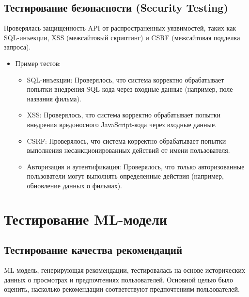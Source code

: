 \subsection*{Тестирование безопасности (Security Testing)}
Проверялась защищенность API от распространенных уязвимостей, таких как SQL-инъекции, XSS (межсайтовый скриптинг) и CSRF (межсайтовая подделка запроса).

\begin{itemize}
    \item Пример тестов:
    \begin{itemize}
        \item SQL-инъекции: Проверялось, что система корректно обрабатывает попытки внедрения SQL-кода через входные данные (например, поле названия фильма).
        \item XSS: Проверялось, что система корректно обрабатывает попытки внедрения вредоносного JavaScript-кода через входные данные.
        \item CSRF: Проверялось, что система корректно обрабатывает попытки выполнения несанкционированных действий от имени пользователя.
        \item Авторизация и аутентификация: Проверялось, что только авторизованные пользователи могут выполнять определенные действия (например, обновление данных о фильмах).
    \end{itemize}
\end{itemize}

\section{Тестирование ML-модели}

\subsection*{Тестирование качества рекомендаций}
ML-модель, генерирующая рекомендации, тестировалась на основе исторических данных о просмотрах и предпочтениях пользователей. Основной целью было оценить, насколько рекомендации соответствуют предпочтениям пользователей.

